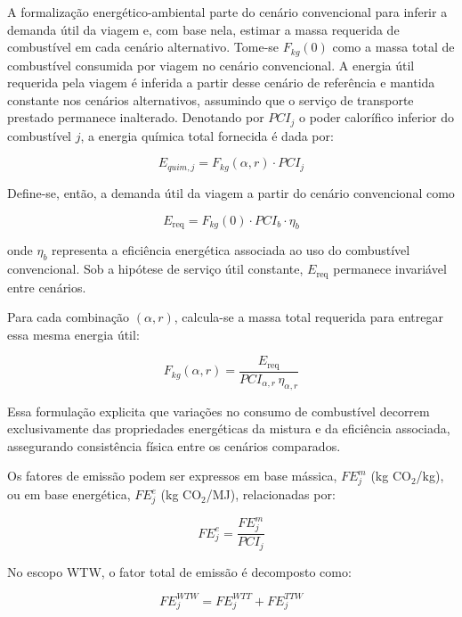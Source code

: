 A formalização energético-ambiental parte do cenário convencional para inferir a demanda útil da viagem e, com base nela, estimar a massa requerida de combustível em cada cenário alternativo. Tome-se $F_{kg}(0)$ como a massa total de combustível consumida por viagem no cenário convencional. A energia útil requerida pela viagem é inferida a partir desse cenário de referência e mantida constante nos cenários alternativos, assumindo que o serviço de transporte prestado permanece inalterado. Denotando por $PCI_j$ o poder calorífico inferior do combustível $j$, a energia química total fornecida é dada por:

\begin{equation}
E_{quim,j} = F_{kg}(\alpha,r) \cdot PCI_j
\end{equation}

Define-se, então, a demanda útil da viagem a partir do cenário convencional como

\begin{equation}
E_{\text{req}} = F_{kg}(0)\cdot PCI_b \cdot \eta_b
\end{equation}

onde $\eta_b$ representa a eficiência energética associada ao uso do combustível convencional. Sob a hipótese de serviço útil constante, $E_{\text{req}}$ permanece invariável entre cenários.

Para cada combinação $(\alpha,r)$, calcula-se a massa total requerida para entregar essa mesma energia útil:

\begin{equation}
F_{kg}(\alpha,r)=\frac{E_{\text{req}}}{PCI_{\alpha,r}\,\eta_{\alpha,r}}
\end{equation}

Essa formulação explicita que variações no consumo de combustível decorrem exclusivamente das propriedades energéticas da mistura e da eficiência associada, assegurando consistência física entre os cenários comparados.

Os fatores de emissão podem ser expressos em base mássica, $FE_j^{m}$ (kg CO$_2$/kg), ou em base energética, $FE_j^{e}$ (kg CO$_2$/MJ), relacionadas por:

\begin{equation}
FE_j^{e} = \frac{FE_j^{m}}{PCI_j}
\end{equation}

No escopo \gls{WTW}, o fator total de emissão é decomposto como:

\begin{equation}
FE_j^{WTW} = FE_j^{WTT} + FE_j^{TTW}
\end{equation}

